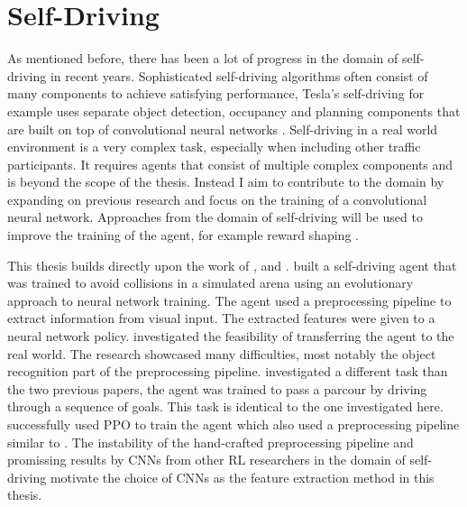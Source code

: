 

\section{Self-Driving}

As mentioned before, there has been a lot of progress in the domain of self-driving in recent years. Sophisticated self-driving algorithms often consist of many components to achieve satisfying performance, Tesla's self-driving for example uses separate object detection, occupancy and planning components that are built on top of convolutional neural networks \autocite{howteslaautopilot}. %
Self-driving in a real world environment is a very complex task, especially when including other traffic participants. It requires agents that consist of multiple complex components \autocite{drl_for_ad} and is beyond the scope of the thesis. Instead I aim to contribute to the domain by expanding on previous research and focus on the training of a convolutional neural network. Approaches from the domain of self-driving will be used to improve the training of the agent, for example reward shaping \autocite{drl_for_ad}.

This thesis builds directly upon the work of \autocite{jonas_koenig}, \autocite{merlin_flach} and \autocite{maximilian}. \autocite{jonas_koenig} built a self-driving agent that was trained to avoid collisions in a simulated arena using an evolutionary approach to neural network training. The agent used a preprocessing pipeline to extract information from visual input. The extracted features were given to a neural network policy. \autocite{merlin_flach} investigated the feasibility of transferring the agent to the real world. The research showcased many difficulties, most notably the object recognition part of the preprocessing pipeline. \autocite{maximilian} investigated a different task than the two previous papers, the agent was trained to pass a parcour by driving through a sequence of goals. This task is identical to the one investigated here. \autocite{maximilian} successfully used PPO to train the agent which also used a preprocessing pipeline similar to \autocite{jonas_koenig}.
The instability of the hand-crafted preprocessing pipeline and promissing results by CNNs from other RL researchers in the domain of self-driving \autocite{neptune} motivate the choice of CNNs as the feature extraction method in this thesis. 



